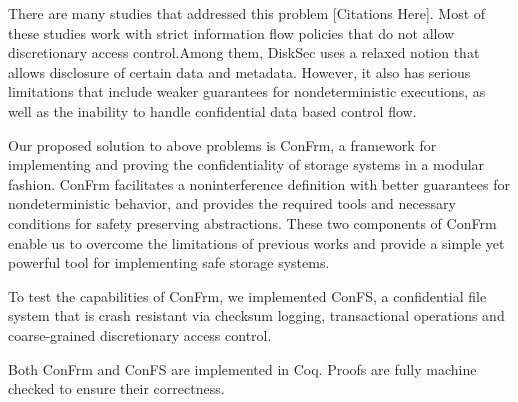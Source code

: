There are many studies that addressed this problem [Citations Here]. Most of these studies work with strict information flow policies that do not allow discretionary access control.Among them, DiskSec uses a relaxed notion that allows disclosure of certain data and metadata. However, it also has serious limitations that include weaker guarantees for nondeterministic executions, as well as the inability to handle confidential data based control flow. 

Our proposed solution to above problems is ConFrm, a framework for implementing and proving the confidentiality of storage systems in a modular fashion. ConFrm facilitates a noninterference definition with better guarantees for nondeterministic behavior, and provides the required tools and necessary conditions for safety preserving abstractions. These two components of ConFrm enable us to overcome the limitations of previous works and provide a simple yet powerful tool for implementing safe storage systems. 

To test the capabilities of ConFrm, we implemented ConFS, a confidential file system that is crash resistant via checksum logging, transactional operations and coarse-grained discretionary access control. 

Both ConFrm and ConFS are implemented in Coq. Proofs are fully machine checked to ensure their correctness.

